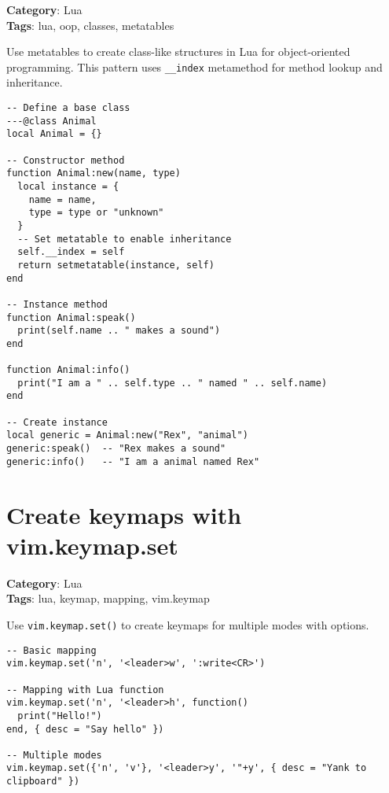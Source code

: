 {{{{{{\textbf{Category}: Lua\\ \textbf{Tags}: lua, oop, classes, metatables
\vspace{0.5cm}

Use metatables to create class-like structures in Lua for object-oriented programming. This pattern uses {\footnotesize \Verb§__index§} metamethod for method lookup and inheritance.

\begin{Exa*}{}
\begin{Verbatim}[fontsize=\footnotesize, breaklines, breakanywhere]
-- Define a base class
---@class Animal
local Animal = {}

-- Constructor method
function Animal:new(name, type)
  local instance = {
    name = name,
    type = type or "unknown"
  }
  -- Set metatable to enable inheritance
  self.__index = self
  return setmetatable(instance, self)
end

-- Instance method
function Animal:speak()
  print(self.name .. " makes a sound")
end

function Animal:info()
  print("I am a " .. self.type .. " named " .. self.name)
end

-- Create instance
local generic = Animal:new("Rex", "animal")
generic:speak()  -- "Rex makes a sound"
generic:info()   -- "I am a animal named Rex"
\end{Verbatim}
\end{Exa*}

\section{Create keymaps with vim.keymap.set}

\textbf{Category}: Lua\\ \textbf{Tags}: lua, keymap, mapping, vim.keymap
\vspace{0.5cm}

Use {\footnotesize \Verb§vim.keymap.set()§} to create keymaps for multiple modes with options.

\begin{Exa*}{}
\begin{Verbatim}[fontsize=\footnotesize, breaklines, breakanywhere]
-- Basic mapping
vim.keymap.set('n', '<leader>w', ':write<CR>')

-- Mapping with Lua function
vim.keymap.set('n', '<leader>h', function()
  print("Hello!")
end, { desc = "Say hello" })

-- Multiple modes
vim.keymap.set({'n', 'v'}, '<leader>y', '"+y', { desc = "Yank to clipboard" })


\end{Verbatim}
\end{Exa*}}}}}}}
